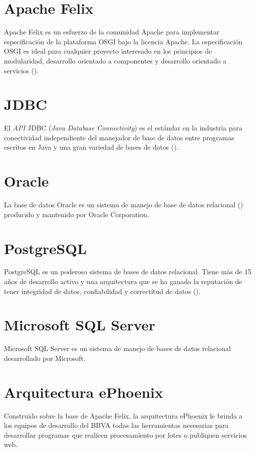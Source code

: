\section{Apache Felix}

Apache Felix es un esfuerzo de la comunidad Apache para implementar especificación de
la plataforma OSGI bajo la licencia Apache. La especificación OSGI es ideal para
cualquier proyecto interesado en los principios de modularidad, desarrollo orientado
a componentes y desarrollo orientado a servicios (\cite{FELIX}).

\section{JDBC}

El \emph{API} JDBC (\emph{Java Database Connectivity}) es el estándar en la industria
para conectividad independiente del manejador de base de datos entre programas escritos en
Java y una gran variedad de bases de datos (\cite{JDBC}).

\section{Oracle}

La base de datos Oracle es un sistema de manejo de base de datos relacional (\cite{ORACLE})
producido y mantenido por Oracle Corporation.

\section{PostgreSQL}

PostgreSQL es un poderoso sistema de bases de datos relacional. Tiene más de
15 años de desarrollo activo y una arquitectura que se ha ganado la reputación de tener
integridad de datos, confiabilidad y correctitud de datos (\cite{POSTGRE}).

\section{Microsoft SQL Server}
Microsoft SQL Server es un sistema de manejo de bases de datos relacional desarrollado por
Microsoft.

\section{Arquitectura ePhoenix}

Construido sobre la base de Apache Felix, la arquitectura ePhoenix le brinda a los
equipos de desarrollo del BBVA todas las herramientas necesarias para desarrollar programas
que realicen procesamiento por lotes o publiquen servicios web.

